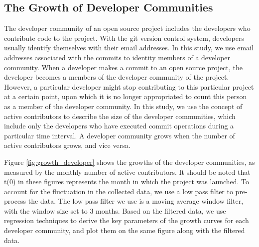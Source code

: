 \documentclass[conference]{IEEEtran}
\begin{document}
\subsection{The Growth of Developer Communities}

The developer community of an open source project includes the developers who contribute code to the project. With the git version control system, developers usually identify themselves with their email addresses. In this study, we use email addresses associated with the commits to identity members of a developer community. When a developer makes a commit to an open source project, the developer becomes a members of the developer community of the project. However, a particular developer might stop contributing to this particular project at a certain point, upon which it is no longer appropriated to count this person as a member of the developer community. In this study, we use the concept of active contributors to describe the size of the developer communities, which include only the developers who have executed commit operations during a particular time interval. A developer community grows when the number of active contributors grows, and vice versa. 

 
Figure \ref{fig:growth_developer} shows the growths of the developer communities, as measured by the monthly number of active contributors. It should be noted that t(0) in these figures represents the month in which the project was launched. To account for the fluctuation in the collected data, we use a low pass filter to pre-process the data. The low pass filter we use is a moving average window filter, with the window size set to 3 months. Based on the filtered data, we use regression techniques to derive the key parameters of the growth curves for each developer community, and plot them on the same figure along with the filtered data. 
\end{document}
